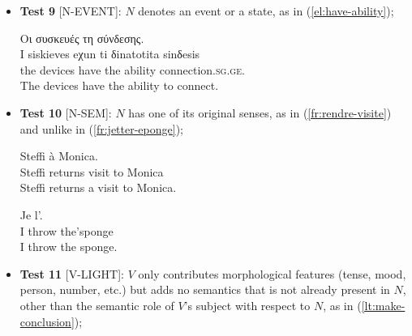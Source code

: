\documentclass[output=paper,modfonts]{langscibook}
\begin{document}
\begin{itemize}
\item[] \textbf{Test 9} [N-EVENT]: $N$ denotes an event or a state, as in (\ref{el:have-ability}); %

\ea \label{el:have-ability}
\settowidth {}
\glll Οι συσκευές  τη \underline{} σύνδεσης.\\
I siskieves eχun ti δinatotita sinδesis \\
the devices have the ability connection.\textsc{sg.ge}.\\ 
\glt The devices have the ability to connect. 
\z

\item[] \textbf{Test 10} [N-SEM]: $N$ has one of its original senses, as in (\ref{fr:rendre-visite}) and unlike in (\ref{fr:jetter-eponge});

\ea \label{fr:rendre-visite}
\settowidth {}
\gll Steffi   à Monica. \\
Steffi returns visit to Monica\\ 
\glt Steffi returns a visit to Monica. 
\z

\ea \label{fr:jetter-eponge}
\settowidth {}
\gll Je  l'. \\
I throw the'sponge\\  
\glt I throw the sponge. 
\z

\item[] \textbf{Test 11} [V-LIGHT]: $V$ only contributes morphological features (tense, mo\-od, person, number, etc.) but 
adds no semantics that is not already present in $N$, other than the semantic role of $V$'s subject with respect to $N$, as in (\ref{lt:make-conclusion});



\end{itemize}
\end{document}
